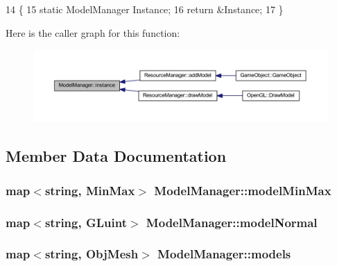 \begin{DoxyCode}
14 \{
15     \textcolor{keyword}{static} ModelManager Instance;
16     \textcolor{keywordflow}{return} &Instance;
17 \}
\end{DoxyCode}


Here is the caller graph for this function\+:\nopagebreak
\begin{figure}[H]
\begin{center}
\leavevmode
\includegraphics[width=350pt]{d3/d3a/class_model_manager_a79cd41892a115d9f30912349624c6f5b_icgraph}
\end{center}
\end{figure}




\subsection{Member Data Documentation}
\subsubsection[{model\+Min\+Max}]{\setlength{\rightskip}{0pt plus 5cm}map$<${\bf string}, {\bf Min\+Max}$>$ Model\+Manager\+::model\+Min\+Max\hspace{0.3cm}{\ttfamily [private]}}\label{class_model_manager_a4de39b09fb069bc15db1daca1558c880}
\subsubsection[{model\+Normal}]{\setlength{\rightskip}{0pt plus 5cm}map$<${\bf string}, {\bf G\+Luint}$>$ Model\+Manager\+::model\+Normal\hspace{0.3cm}{\ttfamily [private]}}\label{class_model_manager_a78c2ec1110163e1a931f0b70b09feb82}
\subsubsection[{models}]{\setlength{\rightskip}{0pt plus 5cm}map$<${\bf string}, {\bf Obj\+Mesh}$>$ Model\+Manager\+::models\hspace{0.3cm}{\ttfamily [private]}}\label{class_model_manager_ab7b025cb1a6809571655ccab492007cb}
